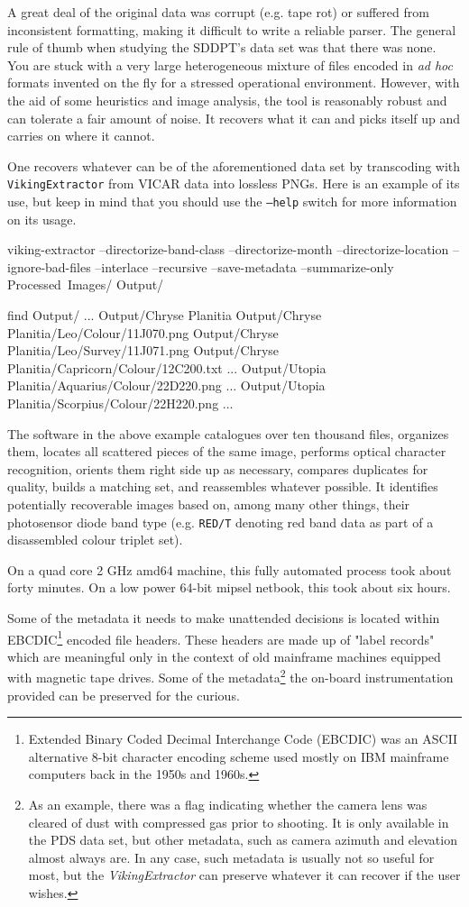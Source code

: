 A great deal of the original data was corrupt (e.g. tape rot) or suffered from inconsistent formatting, making it difficult to write a reliable parser. The general rule of thumb when studying the SDDPT's data set was that there was none. You are stuck with a very large heterogeneous mixture of files encoded in {\it ad hoc} formats invented on the fly for a stressed operational environment. However, with the aid of some heuristics and image analysis, the tool is reasonably robust and can tolerate a fair amount of noise. It recovers what it can and picks itself up and carries on where it cannot.

One recovers whatever can be of the aforementioned data set by transcoding with {\tt VikingExtractor} from VICAR data into lossless PNGs. Here is an example of its use, but keep in mind that you should use the {\tt --help} switch for more information on its usage.

\startCodeExample
\type{$} viking-extractor --directorize-band-class --directorize-month --directorize-location --ignore-bad-files --interlace --recursive --save-metadata --summarize-only Processed\ Images/ Output/

\type{$} find Output/
...
Output/Chryse Planitia
Output/Chryse Planitia/Leo/Colour/11J070.png
Output/Chryse Planitia/Leo/Survey/11J071.png
Output/Chryse Planitia/Capricorn/Colour/12C200.txt
...
Output/Utopia Planitia/Aquarius/Colour/22D220.png
...
Output/Utopia Planitia/Scorpius/Colour/22H220.png
...
\stopCodeExample

The software in the above example catalogues over ten thousand files, organizes them, locates all scattered pieces of the same image, performs optical character recognition, orients them right side up as necessary, compares duplicates for quality, builds a matching set, and reassembles whatever possible. It identifies potentially recoverable images based on, among many other things, their photosensor diode band type (e.g. {\tt RED/T} denoting red band data as part of a disassembled colour triplet set). 

On a quad core 2 GHz amd64 machine, this fully automated process took about forty minutes. On a low power 64-bit mipsel netbook, this took about six hours.

Some of the metadata it needs to make unattended decisions is located within EBCDIC\footnote{Extended Binary Coded Decimal Interchange Code (EBCDIC) was an ASCII alternative 8-bit character encoding scheme used mostly on IBM mainframe computers back in the 1950s and 1960s.} encoded file headers. These headers are made up of "label records" which are meaningful only in the context of old mainframe machines equipped with magnetic tape drives. Some of the metadata\footnote{As an example, there was a flag indicating whether the camera lens was cleared of dust with compressed gas prior to shooting. It is only available in the PDS data set, but other metadata, such as camera azimuth and elevation almost always are. In any case, such metadata is usually not so useful for most, but the {\it VikingExtractor} can preserve whatever it can recover if the user wishes.} the on-board instrumentation provided can be preserved for the curious.

